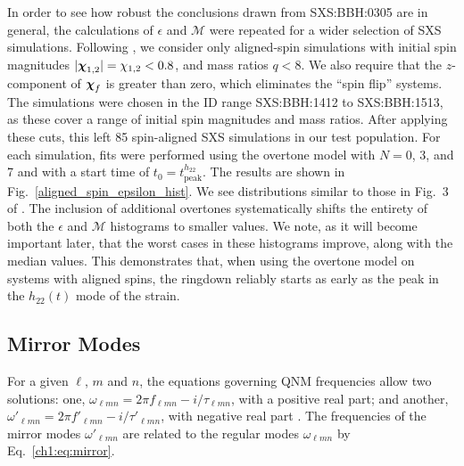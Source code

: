 In order to see how robust the conclusions drawn from SXS:BBH:0305 are in general, the calculations of $\epsilon$ and $\mathcal{M}$ were repeated for a wider selection of SXS simulations. Following \cite{Giesler:2019uxc}, we consider only aligned-spin simulations with initial spin magnitudes $|\vb*{\chi}_{1,2}| = \chi_{1,2} < 0.8$, and mass ratios $q < 8$. We also require that the $z$-component of $\vb*{\chi}_f$ is greater than zero, which eliminates the ``spin flip'' systems. The simulations were chosen in the ID range SXS:BBH:1412 to SXS:BBH:1513, as these cover a range of initial spin magnitudes and mass ratios.
After applying these cuts, this left 85 spin-aligned SXS simulations in our test population.
For each simulation, fits were performed using the overtone model with $N=0$, 3, and 7 and with a start time of $t_0 = t_{\mathrm{peak}}^{h_{22}}$. 
The results are shown in Fig.~\ref{aligned_spin_epsilon_hist}. 
We see distributions similar to those in Fig.~3 of \cite{Giesler:2019uxc}. 
The inclusion of additional overtones systematically shifts the entirety of both the $\epsilon$ and $\mathcal{M}$ histograms to smaller values.
We note, as it will become important later, that the worst cases in these histograms improve, along with the median values.
This demonstrates that, when using the overtone model on systems with aligned spins, the ringdown reliably starts as early as the peak in the $h_{22}(t)$ mode of the strain. 


\subsection{Mirror Modes} \label{subsec:mirror_modes}

For a given $\ell$, $m$ and $n$, the equations governing QNM frequencies allow two solutions: one, $\omega_{\ell m n} = 2\pi f_{\ell m n} - i/\tau_{\ell m n}$, with a positive real part; and another, $\omega'_{\ell m n} = 2\pi f'_{\ell m n} - i/ \tau'_{\ell m n}$, with negative real part \cite{Dhani:2020nik, Berti:2005ys}.
The frequencies of the mirror modes $\omega'_{\ell m n}$ are related to the regular modes $\omega_{\ell m n}$ by Eq.~\ref{ch1:eq:mirror}.

